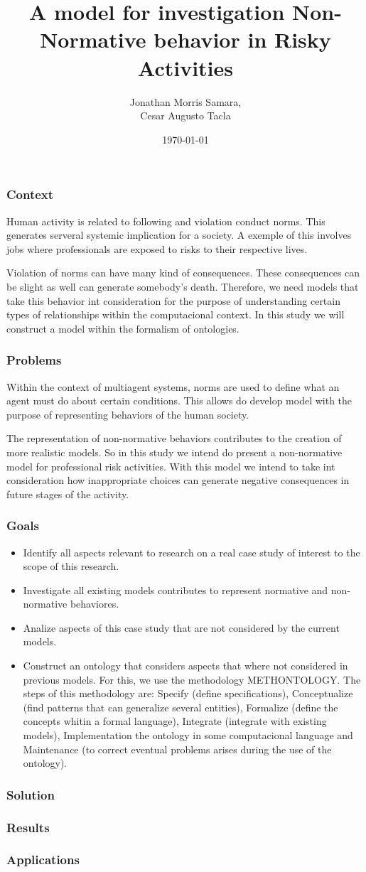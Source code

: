 \documentclass{beamer}
\title[Non-normative Agent Modeling]{A model for investigation Non-Normative behavior in Risky Activities}
\author{Jonathan Morris Samara,\\ Cesar Augusto Tacla} %
\institute[UCLA] %
{
Universidade Tecnológica Federal do Paraná \\ %
\medskip
\textit{jonathan\_samara@hotmail.com \\ cesar.tacla@gmail.com} %
}
\date{\today} %
\begin{document}
\begin{frame}
	\titlepage
\end{frame}
\begin{frame}
	\frametitle{Context}
Human activity is related to following and violation conduct norms. This generates serveral systemic implication for a society. A exemple of this involves jobs where professionals are exposed to risks to their respective lives. 		  

		  Violation of norms can have many kind of consequences. These consequences can be slight as well can generate somebody's death. Therefore, we need models that take this behavior int consideration for the purpose of understanding certain types of relationships within the computacional context. In this study we will construct a model within the formalism of ontologies.
\end{frame}
\begin{frame}
	\frametitle{Problems}
Within the context of multiagent systems, norms are used to define what an agent must do about certain conditions. This allows do develop model with the purpose of representing behaviors of the human society. 
		  
		  The representation of non-normative behaviors contributes to the creation of more realistic models. So in this study we intend do present a non-normative model for professional risk activities. With this model we intend to take int consideration how inappropriate choices can generate negative consequences in future stages of the activity.

\end{frame}
\begin{frame}
	\frametitle{Goals}
	\begin{itemize}
		\item Identify all aspects relevant to research on a real case study of interest to the scope of this research.
		\item Investigate all existing models contributes to represent normative and non-normative behaviores.
		\item Analize aspects of this case study that are not considered by the current models.
		\item Construct an ontology that considers aspects that where not considered in previous models. For this, we use the methodology METHONTOLOGY. The steps of this methodology are: Specify (define specifications), Conceptualize (find patterns that can generalize several entities), Formalize (define the concepts whitin a formal language), Integrate (integrate with existing models), Implementation the ontology in some computacional language and Maintenance (to correct eventual problems arises during the use of the ontology).
	\end{itemize}
\end{frame}
\begin{frame}
	\frametitle{Solution}

\end{frame}
\begin{frame}
	\frametitle{Results}

\end{frame}
\begin{frame}
	\frametitle{Applications}

\end{frame}





\end{document}
